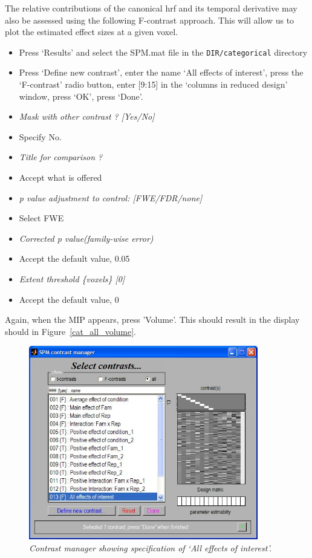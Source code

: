 \documentclass[a4paper,titlepage]{book}
\newcommand{\bi}{\begin{itemize}}
\newcommand{\ei}{\end{itemize}}
\begin{document}
The relative contributions of the canonical hrf and its temporal derivative may also be assessed using the following F-contrast approach. This will allow us to plot the estimated effect sizes at a given voxel.
\bi
\item{Press `Results' and select the SPM.mat file in the 
\verb!DIR/categorical! directory}
\item{Press `Define new contrast', enter the name `All effects of interest', press the `F-contrast' radio button, enter [9:15] in the `columns in reduced design' window, press `OK', press `Done'.}
\item{\em Mask with other contrast ? [Yes/No]}
\item{Specify No.}
\item{\em Title for comparison ?}
\item{Accept what is offered}
\item{\em p value adjustment to control: [FWE/FDR/none]}
\item{Select FWE}
\item{\em Corrected p value(family-wise error)}
\item{Accept the default value, 0.05}
\item{\em Extent threshold \{voxels\} [0]}
\item{Accept the default value, 0}
\ei
Again, when the MIP appears, press 'Volume'. This should result in the display should in Figure~\ref{cat_all_volume}.
\begin{figure}
\begin{center}
\includegraphics[width=100mm]{cat_all_contrast}
\caption{\em Contrast manager showing specification of `All effects of interest'. \label{cat_all_contrast} }
\end{center}
\end{figure}
\end{document}
